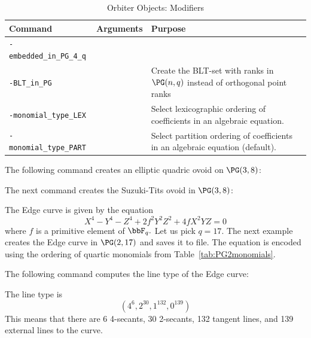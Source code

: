 \begin{table}
\begin{center}
\begin{tabular}{|p{4cm}|l|p{8cm}|}
\hline
Command  & Arguments & Purpose \\
\hline
\hline
\verb'-embedded_in_PG_4_q' &  &  \\
\hline
\verb'-BLT_in_PG' &  & Create the BLT-set with ranks in $\PG(n,q)$ instead of orthogonal point ranks \\
\hline
		\verb'-monomial_type_LEX' &  &  Select lexicographic ordering of coefficients in an algebraic equation. \\
		\hline
		\verb'-monomial_type_PART' &  &  Select partition ordering of coefficients in an algebraic equation (default). \\
		\hline
\end{tabular}
\end{center}
\caption{\label{tab:objects:modifiers}Orbiter Objects: Modifiers}
\end{table}





The following command creates an elliptic quadric ovoid on $\PG(3,8)$:
{\tt

}
The next command creates the Suzuki-Tits ovoid in $\PG(3,8)$:
{\tt

}
The Edge curve is given by the equation
$$
X^4 -Y^4 -Z^4 +2f^2Y^2Z^2 +4fX^2YZ =0
$$
where $f$ is a primitive element of $\bbF_q.$
Let us pick $q=17.$
The next example creates the Edge curve in $\PG(2,17)$ and saves it to file. 
The equation is encoded using the ordering of quartic monomials 
from Table~\ref{tab:PG2monomials}.
{\tt

}
{\tt

}
{\tt

}
{\tt

}
The following command computes the line type of the Edge curve:
{\tt

}
The line type is 
$$
( 4^6, 2^{30}, 1^{132}, 0^{139} )
$$
This means that there are 6 4-secants, 
30 2-secants, 132 tangent lines, and 139 external lines to the curve.




